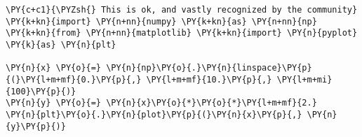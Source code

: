\begin{Verbatim}[label=\makebox{\url{https://bitbucket.org/lbaldini/programming/src/tip/snippets/import1.py}},commandchars=\\\{\}]
\PY{c+c1}{\PYZsh{} This is ok, and vastly recognized by the community}
\PY{k+kn}{import} \PY{n+nn}{numpy} \PY{k+kn}{as} \PY{n+nn}{np}
\PY{k+kn}{from} \PY{n+nn}{matplotlib} \PY{k+kn}{import} \PY{n}{pyplot} \PY{k}{as} \PY{n}{plt}

\PY{n}{x} \PY{o}{=} \PY{n}{np}\PY{o}{.}\PY{n}{linspace}\PY{p}{(}\PY{l+m+mf}{0.}\PY{p}{,} \PY{l+m+mf}{10.}\PY{p}{,} \PY{l+m+mi}{100}\PY{p}{)}
\PY{n}{y} \PY{o}{=} \PY{n}{x}\PY{o}{*}\PY{o}{*}\PY{l+m+mf}{2.}
\PY{n}{plt}\PY{o}{.}\PY{n}{plot}\PY{p}{(}\PY{n}{x}\PY{p}{,} \PY{n}{y}\PY{p}{)}
\end{Verbatim}